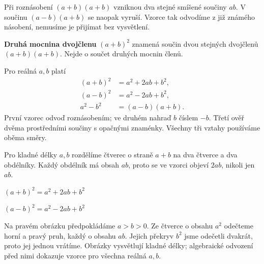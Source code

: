 \documentclass[11pt,a4paper]{article}
\begin{document}

Při roznásobení $(a+b)(a+b)$ vzniknou dva stejné smíšené součiny $ab$. V součinu $(a-b)(a+b)$ se naopak vyruší. Vzorce tak odvodíme z již známého násobení, nemusíme je přijímat bez vysvětlení.

\begin{definiceBox}[title={Definice},breakable=false]
\textbf{Druhá mocnina dvojčlenu} $(a+b)^2$ znamená součin dvou stejných dvojčlenů $(a+b)(a+b)$. Nejde o součet druhých mocnin členů.
\end{definiceBox}


Pro reálná $a,b$ platí
\begin{align*}
(a+b)^2&=a^2+2ab+b^2,\\
(a-b)^2&=a^2-2ab+b^2,\\
a^2-b^2&=(a-b)(a+b).
\end{align*}
První vzorec odvoď roznásobením; ve druhém nahraď $b$ číslem $-b$. Třetí ověř dvěma prostředními součiny s opačnými znaménky. Všechny tři vztahy používáme oběma směry.

Pro kladné délky $a,b$ rozdělíme čtverec o straně $a+b$
na dva čtverce a dva obdélníky. Každý obdélník má obsah $ab$,
proto se ve vzorci objeví $2ab$, nikoli jen $ab$.
\begin{center}
\begin{minipage}[t]{0.48\linewidth}
\centering
{}
\par $(a+b)^2=a^2+2ab+b^2$
\end{minipage}\hfill
\begin{minipage}[t]{0.48\linewidth}
\centering
{}
\par $(a-b)^2=a^2-2ab+b^2$
\end{minipage}
\end{center}
Na pravém obrázku předpokládáme $a>b>0$. Ze čtverce o obsahu $a^2$
odečteme horní a pravý pruh, každý o obsahu $ab$.
Jejich překryv $b^2$ jsme odečetli dvakrát, proto jej jednou vrátíme.
Obrázky vysvětlují kladné délky; algebraické odvození před nimi
dokazuje vzorce pro všechna reálná $a,b$.
\end{document}
